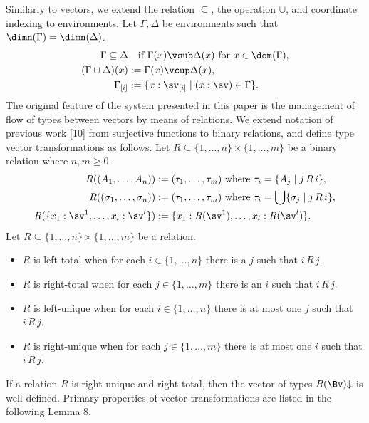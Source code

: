 Similarly to vectors, we extend the relation $\subseteq$, the operation $\cup$, and coordinate indexing to environments.
Let $\Gamma,\Delta$ be environments such that $\dimn(\Gamma)=\dimn(\Delta)$.
\begin{align*}
\Gamma\subseteq\Delta&\quad\text{if }\Gamma(x)\vsub\Delta(x)\text{ for }x\in\dom(\Gamma),\\
(\Gamma\cup\Delta)(x)&:=\Gamma(x)\vcup\Delta(x),\\
\Gamma_{[i]}&:=\{x:\sv_{[i]}\mid(x:\sv)\in\Gamma\}.
\end{align*}
The original feature of the system presented in this paper is the management of flow of types between vectors by means of relations. We extend notation of previous work [10] from surjective functions to binary relations, and define type vector transformations as follows.
Let $R\subseteq\{1,\ldots,n\}\times\{1,\ldots,m\}$ be a binary relation where $n,m\geq0$.
\begin{align*}
R((A_1,\ldots,A_n))&:=(\tau_1,\ldots,\tau_m)\text{ where }\tau_i=\{A_j\mid j\,R\,i\},\\
R((\sigma_1,\ldots,\sigma_n))&:=(\tau_1,\ldots,\tau_m)\text{ where }\tau_i=\bigcup\{\sigma_j\mid j\,R\,i\},\\
R(\{x_1:\sv^1,\ldots,x_l:\sv^l\})&:=\{x_1:R(\sv^1),\ldots,x_l:R(\sv^l)\}.
\end{align*}
Let $R\subseteq\{1,\ldots,n\}\times\{1,\ldots,m\}$ be a relation.
\begin{itemize}
\item $R$ is left-total when for each $i\in\{1,\ldots,n\}$ there is a $j$ such that $i\,R\,j$.
\item $R$ is right-total when for each $j\in\{1,\ldots,m\}$ there is an $i$ such that $i\,R\,j$.
\item $R$ is left-unique when for each $i\in\{1,\ldots,n\}$ there is at most one $j$ such that $i\,R\,j$.
\item $R$ is right-unique when for each $j\in\{1,\ldots,m\}$ there is at most one $i$ such that $i\,R\,j$.
\end{itemize}
If a relation $R$ is right-unique and right-total, then the vector of types $R(\Bv)\mathord\downarrow$ is well-defined. Primary properties of vector transformations are listed in the following Lemma 8.
